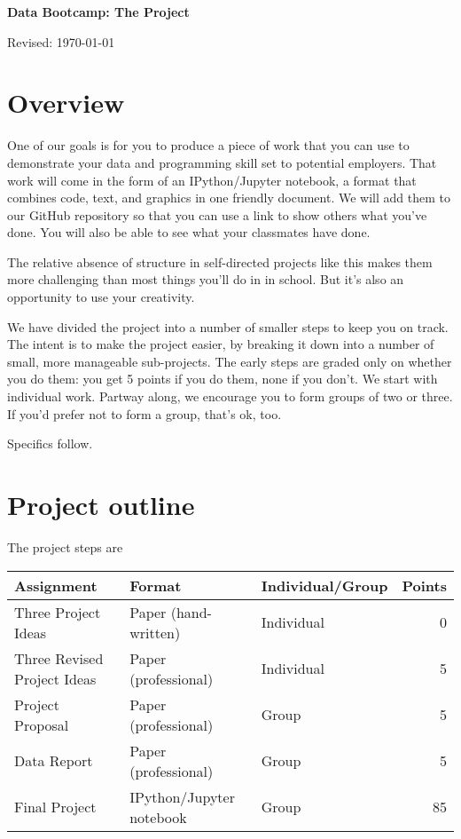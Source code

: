 \documentclass[11pt]{article}
\begin{document}
\bigskipamount
\parindent=0.0in
\thispagestyle{empty}


\bigskip\bigskip
\centerline{\Large \bf Data Bootcamp:  The Project}
\centerline{Revised: \today}

\section*{Overview}

One of our goals is for you to produce a piece of work that you can use
to demonstrate your data and programming skill set to potential employers.
That work will come in the form of an IPython/Jupyter notebook,
a format that combines code, text, and graphics in one friendly document.
We will add them to our GitHub repository so that
you can use a link to show others what you've done.
You will also be able to see what your classmates have done.

The relative absence of structure in self-directed projects like this
makes them more challenging than most things you'll do in in school.
But it's also an opportunity to use your creativity. 

We have divided the project into a number of smaller steps to keep you on track.
The intent is to make the project easier, by breaking it down into a number
of small, more manageable sub-projects.
The early steps are graded only on whether you do them:
you get 5 points if you do them, none if you don't.
We start with individual work.  Partway along, we encourage you to form groups
of two or three.
If you'd prefer not to form a group, that's ok, too.

Specifics follow.


\section*{Project outline}

The project steps are
%
\begin{center}
\begin{tabular}{lllr}
\toprule
Assignment                  & Format  & Individual/Group &  Points \\
\midrule
Three Project Ideas         & Paper (hand-written)  & Individual  & 0  \\
Three Revised Project Ideas & Paper (professional)  & Individual  & 5  \\
Project Proposal            & Paper (professional)  & Group       & 5  \\
Data Report                 & Paper (professional)  & Group       & 5  \\
Final Project               & IPython/Jupyter notebook      & Group       & 85 \\
\bottomrule
\end{tabular}
\end{center}
\end{document}
